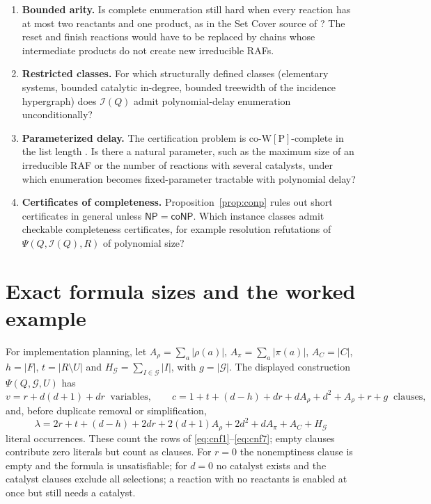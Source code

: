 \documentclass[11pt,a4paper]{article}
\theoremstyle{plain}
\theoremstyle{definition}
\theoremstyle{remark}
\newcommand{\Irr}{\mathcal I}
\newcommand{\NP}{\mathsf{NP}}
\newcommand{\coNP}{\mathsf{coNP}}
\newcommand{\cG}{\mathcal G}
\begin{document}
\begin{enumerate}
\item \textbf{Bounded arity.} Is complete enumeration still hard when every reaction has at most two reactants and one product, as in the Set Cover source of \cite{minraf2026}? The reset and finish reactions would have to be replaced by chains whose intermediate products do not create new irreducible RAFs.
\item \textbf{Restricted classes.} For which structurally defined classes (elementary systems, bounded catalytic in-degree, bounded treewidth of the incidence hypergraph) does $\Irr(Q)$ admit polynomial-delay enumeration unconditionally?
\item \textbf{Parameterized delay.} The certification problem is co-$\mathrm{W[P]}$-complete in the list length \cite{certification2026}. Is there a natural parameter, such as the maximum size of an irreducible RAF or the number of reactions with several catalysts, under which enumeration becomes fixed-parameter tractable with polynomial delay?
\item \textbf{Certificates of completeness.} Proposition~\ref{prop:conp} rules out short certificates in general unless $\NP=\coNP$. Which instance classes admit checkable completeness certificates, for example resolution refutations of $\Psi(Q,\Irr(Q),R)$ of polynomial size?
\end{enumerate}

\appendix

\section{Exact formula sizes and the worked example}\label{app:counts}

For implementation planning, let $A_\rho=\sum_a|\rho(a)|$, $A_\pi=\sum_a|\pi(a)|$, $A_C=|C|$, $h=|F|$, $t=|R\setminus U|$ and $H_\cG=\sum_{I\in\cG}|I|$, with $g=|\cG|$. The displayed construction $\Psi(Q,\cG,U)$ has
\[
 v=r+d(d+1)+dr\ \text{ variables},\qquad
 c=1+t+(d-h)+dr+dA_\rho+d^2+A_\rho+r+g\ \text{ clauses},
\]
and, before duplicate removal or simplification,
\[
 \lambda=2r+t+(d-h)+2dr+2(d+1)A_\rho+2d^2+dA_\pi+A_C+H_\cG
\]
literal occurrences. These count the rows of \eqref{eq:cnf1}--\eqref{eq:cnf7}; empty clauses contribute zero literals but count as clauses. For $r=0$ the nonemptiness clause is empty and the formula is unsatisfiable; for $d=0$ no catalyst exists and the catalyst clauses exclude all selections; a reaction with no reactants is enabled at once but still needs a catalyst.
\end{document}
